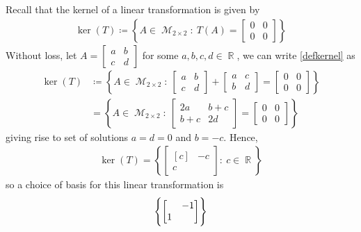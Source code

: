 \documentclass{amsart}
\theoremstyle{definition}
\theoremstyle{definition}
\DeclareMathOperator{\R}{\mathbb{R}}
\DeclareMathOperator{\1}{\mathbbm{1}}
\DeclareMathOperator{\MM}{\mathcal{M}}
\newcommand{\condset}[4]{\left\{ #1  : \: #2 #3 #4 \right\}}
\begin{document}
\begin{enumerate}[itemsep = 2mm]
\begin{enumerate}
			Recall that the kernel of a linear transformation is given by
			\begin{align}
			\label{defkernel}
			\ker(T) \coloneqq \condset{A \in \MM_{2 \times 2}}{T(A)}{=}{\begin{bmatrix}
				0 & 0 \\ 0& 0 
				\end{bmatrix}}
			\end{align}
			Without loss, let $A = \begin{bmatrix}
			a & b \\ c & d 
			\end{bmatrix}$ for some $a,b,c,d \in \R$, we can write \eqref{defkernel} as
			\begin{align*}
				\ker(T) &\coloneqq \condset{A \in \MM_{2 \times 2}}{\begin{bmatrix}
					a & b \\ c & d 
					\end{bmatrix} + \begin{bmatrix}
					a & c \\ b & d 
					\end{bmatrix}}{=}{\begin{bmatrix}
					0 & 0 \\ 0& 0 
					\end{bmatrix}} \\
				&=  \condset{A \in \MM_{2 \times 2}}{\begin{bmatrix}
					2a & b+c \\ b+c & 2d 
					\end{bmatrix} }{=}{\begin{bmatrix}
					0 & 0 \\ 0& 0 
					\end{bmatrix}} 
			\end{align*}
			giving rise to set of solutions $a=d=0$ and $b=-c$. Hence,
			\begin{align}
			\label{eqkernel}
			\ker(T) = \condset{ \begin{bmatrix*}[c]
				& -c \\ c & 
				\end{bmatrix*}}{c}{\in}{\R}
			\end{align}
			so a choice of basis for this linear transformation is
			\begin{align*}
			\set{ \begin{bmatrix*}[c]
				& -1 \\ 1 & 
				\end{bmatrix*} }
			\end{align*}
		\end{enumerate}
		

\end{enumerate}
\end{document}
